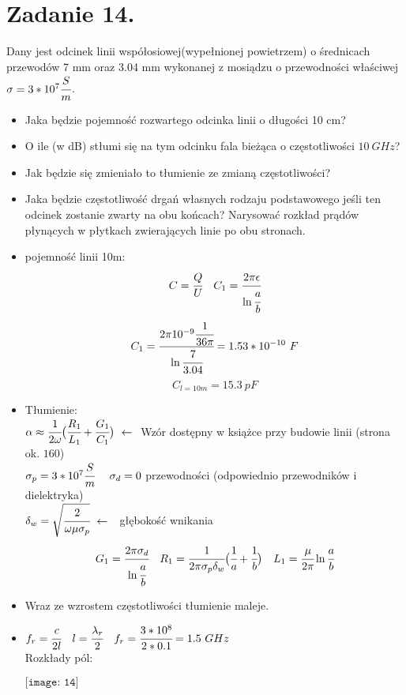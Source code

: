 \section*{Zadanie 14.}
\begin{task}
Dany jest odcinek linii współosiowej(wypełnionej powietrzem) o średnicach przewodów 7 mm oraz 3.04 mm wykonanej z mosiądzu o przewodności właściwej $\sigma=3*10^{7} \cfrac{S}{m}$.
\begin{itemize}
\item Jaka będzie pojemność rozwartego odcinka linii o długości 10 cm?
\item O ile (w dB) stłumi się na tym odcinku fala bieżąca o częstotliwości $10\ GHz$?
\item Jak będzie się zmieniało to tłumienie ze zmianą częstotliwości?
\item Jaka będzie częstotliwość drgań własnych rodzaju podstawowego jeśli ten odcinek zostanie zwarty na obu końcach? Narysować rozkład prądów płynących w płytkach zwierających linie po obu stronach.\\
\end{itemize}
\end{task}

\begin{solution}
\begin{itemize}
\item pojemność linii 10m:\\
$$C=\cfrac{Q}{U} \ \ \ C_{1}=\cfrac{2\pi\epsilon}{\ln{\cfrac{a}{b}}}$$
$$C_{1}=\cfrac{2\pi10^{-9}\cfrac{1}{36\pi}}{\ln{\cfrac{7}{3.04}}}=1.53*10^{-10}\ F$$
$$C_{l=10m}=15.3\ pF$$

\item Tłumienie:\\
$\alpha\approx\cfrac{1}{2\omega}\big{(} \cfrac{R_{1}}{L_{1}} +\cfrac{G_{1}}{C_{1}} \big{)} \ \leftarrow \ \ $Wzór dostępny w książce przy budowie linii (strona ok. $160$)\\
$\sigma_{p}=3*10^{7} \cfrac{S}{m} \ \ \ \ \sigma_{d}=0$ przewodności (odpowiednio przewodników i dielektryka)\\
$\delta_{w}=\sqrt{\cfrac{2}{\omega\mu\sigma_{p}}}\ \leftarrow \ \ $ głębokość wnikania\\
$$G_{1}=\cfrac{2\pi\sigma_{d}}{\ln{\cfrac{a}{b}}}\ \ \ R_{1}=\cfrac{1}{2\pi\sigma_{p}\delta_{w}}\big{(} \cfrac{1}{a} + \cfrac{1}{b} \big{)} \ \ \ L_{1} = \cfrac{\mu}{2\pi}\ln{\cfrac{a}{b}}$$
\item Wraz ze wzrostem częstotliwości tłumienie maleje.
\item $f_{r}=\cfrac{c}{2l} \ \ \ l=\cfrac{\lambda_{r}}{2} \ \ \ f_{r}=\cfrac{3*10^{8}}{2*0.1}=1.5\ GHz$\\
Rozkłady pól:
\begin{center}
$\texttt{[image: 14]}$\\
\end{center}
\end{itemize}
\end{solution}